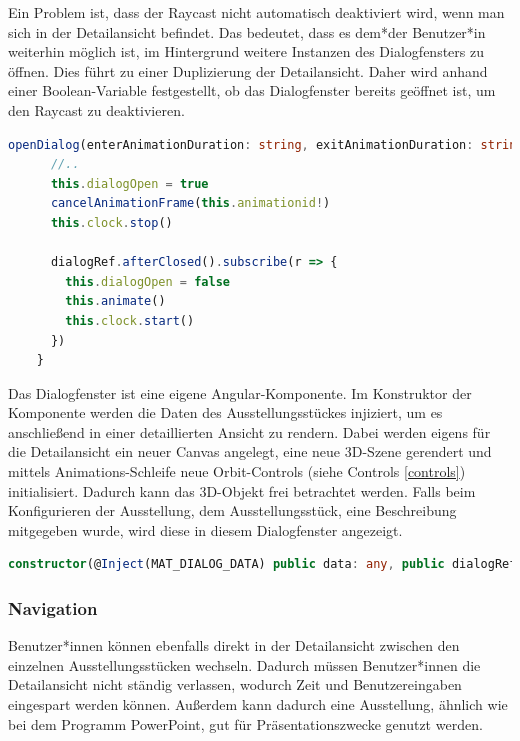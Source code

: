 Ein Problem ist, dass der Raycast nicht automatisch deaktiviert wird, wenn man sich in der Detailansicht befindet. Das bedeutet, dass es dem*der Benutzer*in weiterhin möglich ist, im Hintergrund weitere Instanzen des Dialogfensters zu öffnen. Dies führt zu einer Duplizierung der Detailansicht. Daher wird anhand einer Boolean-Variable festgestellt, ob das Dialogfenster bereits geöffnet ist, um den Raycast zu deaktivieren. 

\begin{lstlisting}[caption={Öffnen und Schließen des Dialogfensters},language=TypeScript]
  openDialog(enterAnimationDuration: string, exitAnimationDuration: string): void {
      //..
      this.dialogOpen = true
      cancelAnimationFrame(this.animationid!)
      this.clock.stop()
  
      dialogRef.afterClosed().subscribe(r => {
        this.dialogOpen = false
        this.animate()
        this.clock.start()
      })
    }
\end{lstlisting}

Das Dialogfenster ist eine eigene Angular-Komponente. Im Konstruktor der Komponente werden die Daten des Ausstellungsstückes injiziert, um es anschließend in einer detaillierten Ansicht zu rendern. Dabei werden eigens für die Detailansicht ein neuer Canvas angelegt, eine neue 3D-Szene gerendert und mittels Animations-Schleife neue Orbit-Controls (siehe Controls \ref{controls}) initialisiert. Dadurch kann das 3D-Objekt frei betrachtet werden. Falls beim Konfigurieren der Ausstellung, dem Ausstellungsstück, eine Beschreibung mitgegeben wurde, wird diese in diesem Dialogfenster angezeigt.

  \begin{lstlisting}[caption={Constructor-Injection in der Dialog Komponente},language=TypeScript]
    constructor(@Inject(MAT_DIALOG_DATA) public data: any, public dialogRef: MatDialogRef<ExhibitDialog>) {}

  \end{lstlisting}

\subsubsection{Navigation}
Benutzer*innen können ebenfalls direkt in der Detailansicht zwischen den einzelnen Ausstellungsstücken wechseln. Dadurch müssen Benutzer*innen die Detailansicht nicht ständig verlassen, wodurch Zeit und Benutzereingaben eingespart werden können. Außerdem kann dadurch eine Ausstellung, ähnlich wie bei dem Programm PowerPoint, gut für Präsentationszwecke genutzt werden.  



